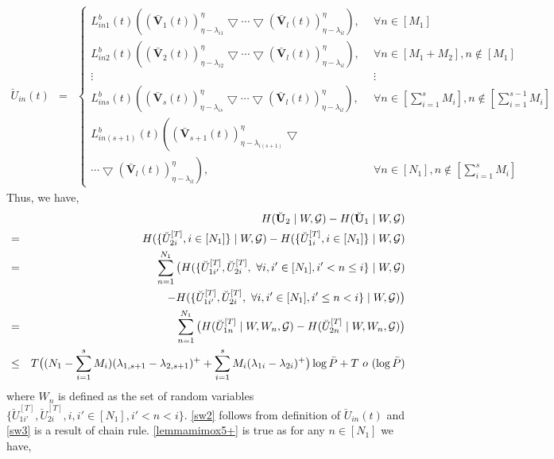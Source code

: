 \documentclass[11pt]{article}
\begin{document}
\begin{eqnarray}
\breve{U}_{in}(t)&=&\left\{\begin{matrix}
 L_{in1}^b(t)\left((\bar{\mathbf{V}}_1(t))^{\eta}_{\eta-\lambda_{i1}}\bigtriangledown\cdots\bigtriangledown(\bar{\mathbf{V}}_l(t))^{\eta}_{\eta-\lambda_{il}}\right),~~&\forall n\in[M_1]\\ 
 L_{in2}^b(t)\left((\bar{\mathbf{V}}_2(t))^{\eta}_{\eta-\lambda_{i2}}\bigtriangledown\cdots\bigtriangledown(\bar{\mathbf{V}}_l(t))^{\eta}_{\eta-\lambda_{il}}\right),~& \forall n\in[M_1+M_2],n\notin[M_1]\\ 
\vdots& \vdots\\
L_{ins}^b(t)\left((\bar{\mathbf{V}}_s(t))^{\eta}_{\eta-\lambda_{is}}\bigtriangledown\cdots\bigtriangledown(\bar{\mathbf{V}}_l(t))^{\eta}_{\eta-\lambda_{il}}\right),&\forall n\in[\sum_{i=1}^sM_i],n\notin[\sum_{i=1}^{s-1}M_i]\\
 L_{in(s+1)}^b(t)\left((\bar{\mathbf{V}}_{s+1}(t))^{\eta}_{\eta-\lambda_{i(s+1)}} \bigtriangledown\right.&\\
\left.\cdots\bigtriangledown(\bar{\mathbf{V}}_l(t))^{\eta}_{\eta-\lambda_{il}}\right),&\forall n\in[N_1],n\notin[\sum_{i=1}^sM_i]
\end{matrix}\right. \label{lemmamimox9}
\end{eqnarray}
Thus, we have,
\begin{eqnarray}
&&H({\breve{\bf U}}_2\mid W,\mathcal{G})-H({\breve{\bf U}}_1\mid W,\mathcal{G})\nonumber\\
&=&H(\{\breve{U}_{2i}^{[T]},i\in[N_1]\}\mid W,\mathcal{G})-H(\{\breve{U}_{1i}^{[T]},i\in[N_1]\}\mid W,\mathcal{G})\label{sw1}\\
&=&\sum_{n=1}^{N_1}\big(H(\{\breve{U}_{1i'}^{[T]},\breve{U}_{2i}^{[T]},~\forall i,i'\in[N_1],i'<n\le i\}\mid W,\mathcal{G})\nonumber\\
&&-H(\{\breve{U}_{1i'}^{[T]},\breve{U}_{2i}^{[T]},~\forall i,i'\in[N_1],i'\le n<i\}\mid W,\mathcal{G})\big)\label{sw2}\\
&=&\sum_{n=1}^{N_1}\big(H(\breve{U}_{1n}^{[T]}\mid W,W_n,\mathcal{G})-H(\breve{U}_{2n}^{[T]}\mid W,W_n,\mathcal{G})\big)\label{sw3}\\
&\le&T\big((N_1-\sum_{i=1}^sM_i)(\lambda_{1,s+1}-\lambda_{2,s+1})^++\sum_{i=1}^sM_i(\lambda_{1i}-\lambda_{2i})^+\big)\log{\bar{P}}+T~o~(\log{\bar{P}})\label{lemmamimox5+}
\end{eqnarray}
where $W_n$ is defined as the set of random variables $\{\breve{U}_{1i'}^{[T]},\breve{U}_{2i}^{[T]},i,i'\in[N_1],i'<n<i\}$. \eqref{sw2} follows from definition of $\breve{U}_{in}(t)$ and \eqref{sw3} is a result of chain rule. \eqref{lemmamimox5+} is true as for any $n\in[N_1]$ we have,
\end{document}
